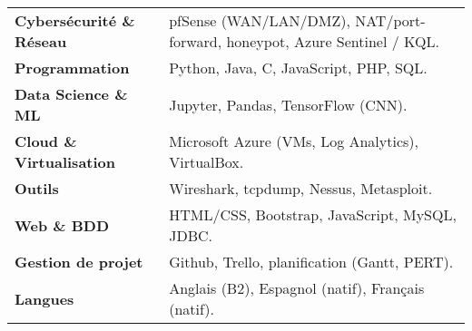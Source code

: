 \documentclass[a4paper,10pt]{article}
\begin{document}
\begin{tabular}{p{5cm} p{15cm}}
\textbf{Cybersécurité \& Réseau} & pfSense (WAN/LAN/DMZ), NAT/port-forward, honeypot, Azure Sentinel / KQL. \\
\textbf{Programmation} & Python, Java, C, JavaScript, PHP, SQL. \\
\textbf{Data Science \& ML} & Jupyter, Pandas, TensorFlow (CNN). \\
\textbf{Cloud \& Virtualisation} & Microsoft Azure (VMs, Log Analytics), VirtualBox. \\
\textbf{Outils} & Wireshark, tcpdump, Nessus, Metasploit. \\
\textbf{Web \& BDD} & HTML/CSS, Bootstrap, JavaScript, MySQL, JDBC. \\
\textbf{Gestion de projet} & Github, Trello, planification (Gantt, PERT). \\
\textbf{Langues} & Anglais (B2), Espagnol (natif), Français (natif). \\
\end{tabular}
\end{document}
